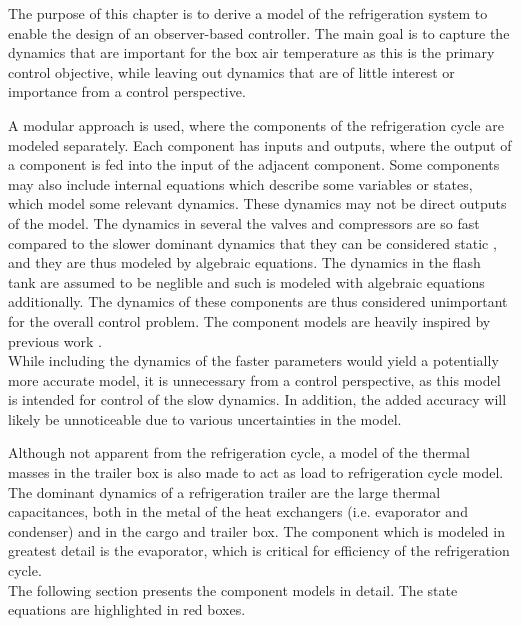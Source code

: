 The purpose of this chapter is to derive a model of the refrigeration system to enable the design of an observer-based controller. The main goal is to capture the dynamics that are important for the box air temperature as this is the primary control objective, while leaving out dynamics that are of little interest or importance from a control perspective.

A modular approach is used, where the components of the refrigeration cycle are modeled separately. Each component has inputs and outputs, where the output of a component is fed into the input of the adjacent component. Some components may also include internal equations which describe some variables or states, which model some relevant dynamics. These dynamics may not be direct outputs of the model. The dynamics in several the valves and compressors are so fast compared to the slower dominant dynamics that they can be considered static \cite{Rasmussen2005}, and they are thus modeled by algebraic equations. The dynamics in the flash tank are assumed to be neglible and such is modeled with algebraic equations additionally.
The dynamics of these components are thus considered unimportant for the overall control problem. The component models are heavily inspired by previous work \cite{Sorensen2013}. \\

While including the dynamics of the faster parameters would yield a potentially more accurate model, it is unnecessary from a control perspective, as this model is intended for control of the slow dynamics. In addition, the added accuracy will likely be unnoticeable due to various uncertainties in the model.

Although not apparent from the refrigeration cycle, a model of the thermal masses in the trailer box is also made to act as load to refrigeration cycle model. The dominant dynamics of a refrigeration trailer are the large thermal capacitances, both in the metal of the heat exchangers (i.e. evaporator and condenser) and in the cargo and trailer box. The component which is modeled in greatest detail is the evaporator, which is critical for efficiency of the refrigeration cycle. \\

\noindent The following section presents the component models in detail. The state equations are highlighted in red boxes.